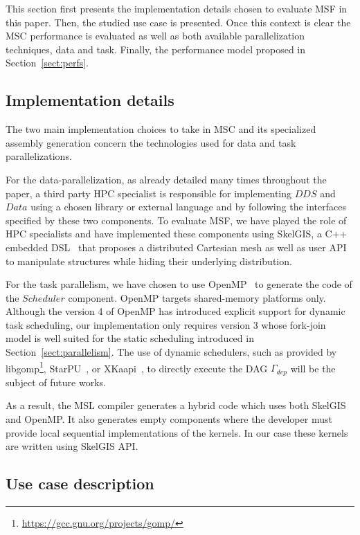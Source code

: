 This section first presents the implementation details chosen to evaluate MSF in this paper. Then, the studied use case is presented. Once this context is clear the MSC performance is evaluated as well as both available parallelization techniques, data and task. Finally, the performance model proposed in Section~\ref{sect:perfs}.

\subsection{Implementation details}

The two main implementation choices to take in MSC and its specialized assembly generation concern the technologies used for data and task parallelizations.

For the data-parallelization, as already detailed many times throughout the paper, a third party HPC specialist is responsible for implementing $DDS$ and $Data$ using a chosen library or external language and by following the interfaces specified by these two components. To evaluate MSF, we have played the role of HPC specialists and have implemented these components using SkelGIS, a C++ embedded DSL~\cite{CPE:CPE3494} that proposes a distributed Cartesian mesh as well as user API to manipulate structures while hiding their underlying distribution.

For the task parallelism, we have chosen to use OpenMP~\cite{660313} to generate the code of the $Scheduler$ component. OpenMP targets shared-memory platforms only. Although the version 4 of OpenMP has introduced explicit support for dynamic task scheduling, our implementation only requires version 3 whose fork-join model is well suited for the static scheduling introduced in Section~\ref{sect:parallelism}.
The use of dynamic schedulers, such as provided by libgomp\footnote{\url{https://gcc.gnu.org/projects/gomp/}}, StarPU~\cite{Augonnet2011}, or XKaapi~\cite{Gautier:2013:XRS:2510661.2511383},  to directly execute the DAG $\Gamma_{dep}$ will be the subject of future works.

As a result, the MSL compiler generates a hybrid code which uses both SkelGIS and OpenMP.
It also generates empty components where the developer must provide local sequential implementations of the kernels. In our case these kernels are written using SkelGIS API.

\subsection{Use case description}


